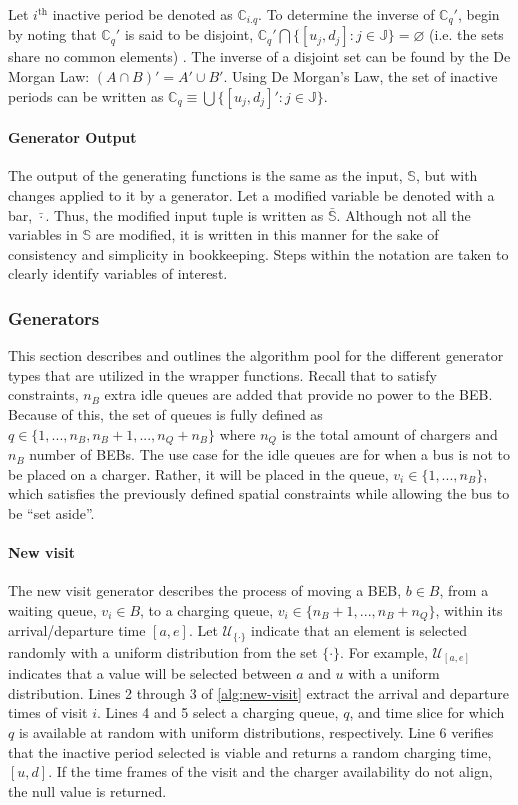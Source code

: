 \documentclass[11pt,a4paper,final]{article}
\newcommand{\C}{\mathbb{C}}                 %
\newcommand{\U}{\mathcal{U}}                %
\newcommand{\Sol}{\mathbb{S}}               %
\newcommand{\Jsetq}{\mathbb{J}}             %
\begin{document}
Let \(i^{\text{th}}\) inactive period be denoted as \(\C_{i.q}\). To determine the inverse of \(\C_q'\), begin by noting that
\(\C_q'\) is said to be disjoint, \(\C_q' \bigcap \{[u_j, d_j] : j \in \Jsetq\} = \varnothing\) (i.e. the sets share no common
elements) \cite{halmos-1974-naive-set-theor}. The inverse of a disjoint set can be found by the De Morgan Law: \((A \cap
B)' = A' \cup B'\). Using De Morgan's Law, the set of inactive periods can be written as \(\C_q \equiv \bigcup \{[u_j, d_j]': j \in
\Jsetq\}\).

\paragraph{Generator Output}
\label{sec:org9f0c208}
The output of the generating functions is the same as the input, \(\Sol\), but with changes applied to it by a generator.
Let a modified variable be denoted with a bar, \(\bar{\cdot}\). Thus, the modified input tuple is written as \(\bar{\Sol}\).
Although not all the variables in \(\Sol\) are modified, it is written in this manner for the sake of consistency and
simplicity in bookkeeping. Steps within the notation are taken to clearly identify variables of interest.

\subsubsection{Generators}
\label{sec:generators}
This section describes and outlines the algorithm pool for the different generator types that are utilized in the
wrapper functions. Recall that to satisfy constraints, \(n_B\) extra idle queues are added that provide no power to the
BEB. Because of this, the set of queues is fully defined as \(q \in \{1,..., n_B, n_B+1,..., n_Q+n_B\}\) where \(n_Q\) is the
total amount of chargers and \(n_B\) number of BEBs. The use case for the idle queues are for when a bus is not to be
placed on a charger. Rather, it will be placed in the queue, \(v_i \in \{1,..., n_B\}\), which satisfies the previously
defined spatial constraints while allowing the bus to be ``set aside''.

\paragraph{New visit}
\label{sec:new-visit}
The new visit generator describes the process of moving a BEB, \(b \in B\), from a waiting queue, \(v_i \in B\), to a charging
queue, \(v_i \in \{n_B+1,..., n_B + n_Q\}\), within its arrival/departure time \([a, e]\). Let \(\U_{\{\cdot\}}\) indicate that an
element is selected randomly with a uniform distribution from the set \(\{\cdot\}\). For example, \(\U_{[a, e]}\) indicates that
a value will be selected between \(a\) and \(u\) with a uniform distribution. Lines 2 through 3 of \ref{alg:new-visit}
extract the arrival and departure times of visit \(i\). Lines 4 and 5 select a charging queue, \(q\), and time slice for
which \(q\) is available at random with uniform distributions, respectively. Line 6 verifies that the inactive period
selected is viable and returns a random charging time, \([u, d]\). If the time frames of the visit and the charger
availability do not align, the null value is returned.
\end{document}
